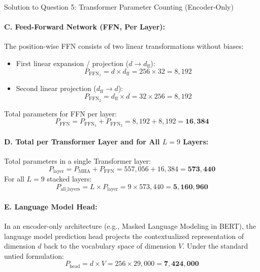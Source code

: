 \documentclass[11pt,a4paper]{article}
\begin{document}
\begin{solutionbox}{Solution to Question 5: Transformer Parameter Counting (Encoder-Only)}
\paragraph{C. Feed-Forward Network (FFN, Per Layer):}
The position-wise FFN consists of two linear transformations without biases:
\begin{itemize}[noitemsep]
    \item First linear expansion / projection ($d \to d_{\text{ff}}$):
    \begin{equation*}
    P_{\text{FFN}_1} = d \times d_{\text{ff}} = 256 \times 32 = 8{,}192
    \end{equation*}
    \item Second linear projection ($d_{\text{ff}} \to d$):
    \begin{equation*}
    P_{\text{FFN}_2} = d_{\text{ff}} \times d = 32 \times 256 = 8{,}192
    \end{equation*}
\end{itemize}
Total parameters for FFN per layer:
\begin{equation*}
P_{\text{FFN}} = P_{\text{FFN}_1} + P_{\text{FFN}_2} = 8{,}192 + 8{,}192 = \mathbf{16{,}384}
\end{equation*}

\paragraph{D. Total per Transformer Layer and for All $L = 9$ Layers:}
Total parameters in a single Transformer layer:
\begin{equation*}
P_{\text{layer}} = P_{\text{MHA}} + P_{\text{FFN}} = 557{,}056 + 16{,}384 = \mathbf{573{,}440}
\end{equation*}
For all $L = 9$ stacked layers:
\begin{equation*}
P_{\text{all\_layers}} = L \times P_{\text{layer}} = 9 \times 573{,}440 = \mathbf{5{,}160{,}960}
\end{equation*}

\paragraph{E. Language Model Head:}
In an encoder-only architecture (e.g., Masked Language Modeling in BERT), the language model prediction head projects the contextualized representation of dimension $d$ back to the vocabulary space of dimension $V$. Under the standard untied formulation:
\begin{equation*}
P_{\text{head}} = d \times V = 256 \times 29{,}000 = \mathbf{7{,}424{,}000}
\end{equation*}


\end{solutionbox}
\end{document}

